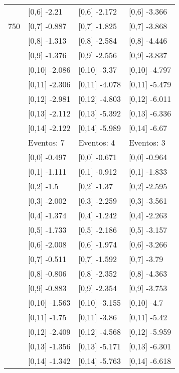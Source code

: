 \begin{table}
\begin{tabular}[t]{llll}
 & {}[0,6] -2.21 & {}[0,6] -2.172 & {}[0,6] -3.366\\
750 & {}[0,7] -0.887 & {}[0,7] -1.825 & {}[0,7] -3.868\\
\addlinespace
 & {}[0,8] -1.313 & {}[0,8] -2.584 & {}[0,8] -4.446\\
 & {}[0,9] -1.376 & {}[0,9] -2.556 & {}[0,9] -3.837\\
 & {}[0,10] -2.086 & {}[0,10] -3.37 & {}[0,10] -4.797\\
 & {}[0,11] -2.306 & {}[0,11] -4.078 & {}[0,11] -5.479\\
 & {}[0,12] -2.981 & {}[0,12] -4.803 & {}[0,12] -6.011\\
\addlinespace
 & {}[0,13] -2.112 & {}[0,13] -5.392 & {}[0,13] -6.336\\
 & {}[0,14] -2.122 & {}[0,14] -5.989 & {}[0,14] -6.67\\
 & Eventos:  7 & Eventos:  4 & Eventos:  3\\
 & {}[0,0] -0.497 & {}[0,0] -0.671 & {}[0,0] -0.964\\
 & {}[0,1] -1.111 & {}[0,1] -0.912 & {}[0,1] -1.833\\
\addlinespace
 & {}[0,2] -1.5 & {}[0,2] -1.37 & {}[0,2] -2.595\\
 & {}[0,3] -2.002 & {}[0,3] -2.259 & {}[0,3] -3.561\\
 & {}[0,4] -1.374 & {}[0,4] -1.242 & {}[0,4] -2.263\\
 & {}[0,5] -1.733 & {}[0,5] -2.186 & {}[0,5] -3.157\\
 & {}[0,6] -2.008 & {}[0,6] -1.974 & {}[0,6] -3.266\\
\addlinespace
1000 & {}[0,7] -0.511 & {}[0,7] -1.592 & {}[0,7] -3.79\\
 & {}[0,8] -0.806 & {}[0,8] -2.352 & {}[0,8] -4.363\\
 & {}[0,9] -0.883 & {}[0,9] -2.354 & {}[0,9] -3.753\\
 & {}[0,10] -1.563 & {}[0,10] -3.155 & {}[0,10] -4.7\\
 & {}[0,11] -1.75 & {}[0,11] -3.86 & {}[0,11] -5.42\\
\addlinespace
 & {}[0,12] -2.409 & {}[0,12] -4.568 & {}[0,12] -5.959\\
 & {}[0,13] -1.356 & {}[0,13] -5.171 & {}[0,13] -6.301\\
 & {}[0,14] -1.342 & {}[0,14] -5.763 & {}[0,14] -6.618\\
\bottomrule
\end{tabular}
\end{table}
